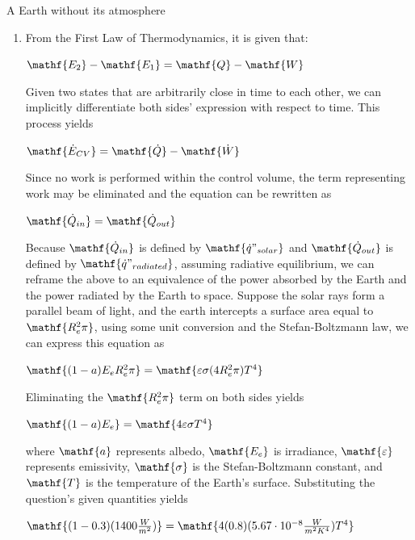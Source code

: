 \documentclass{homework}
\begin{document}
\question A Earth without its atmosphere
\begin{enumerate}[label=(\alph*)]
    \item
    From the First Law of Thermodynamics, it is given that:
    \begin{center}$\mathf{E_2} - \mathf{E_1} = \mathf{Q} - \mathf{W}$
    \end{center}
    Given two states that are arbitrarily close in time to each other, we can implicitly differentiate both sides' expression with respect to time. This process yields
    \begin{center}$\mathf{\dot E_{CV}} = \mathf{\dot Q} - \mathf{\dot W}$\end{center}
    Since no work is performed within the control volume, the term representing work may be eliminated and the equation can be rewritten as
    \begin{center}$\mathf{\dot Q_{in}} = \mathf{\dot Q_{out}}$
    \end{center}
    Because $\mathf{\dot Q_{in}}$ is defined by $\mathf{\dot q"_{solar}}$ and $\mathf{\dot Q_{out}}$ is defined by $\mathf{\dot q"_{radiated}}$, assuming radiative equilibrium, we can reframe the above to an equivalence of the power absorbed by the Earth and the power radiated by the Earth to space. Suppose the solar rays form a parallel beam of light, and the earth intercepts a surface area equal to $\mathf{R_e^2\pi}$, using some unit conversion and the Stefan-Boltzmann law, we can express this equation as
    \begin{center}
        $\mathf{(1 - a) E_e{R_e^2\pi}} =\mathf{\varepsilon\sigma(4{R_e^2\pi})T^4}$
    \end{center}
   \begin{center}
       Eliminating the $\mathf{R_e^2\pi}$ term on both sides yields
   \end{center} 
    \begin{center}
        $\mathf{(1 - a)E_e} = \mathf{4\varepsilon\sigma T^4}$
    \end{center}
    where $\mathf{a}$ represents albedo, $\mathf{E_e}$ is irradiance, $\mathf{\varepsilon}$ represents emissivity, $\mathf{\sigma}$ is the Stefan-Boltzmann constant, and $\mathf{T}$ is the temperature of the Earth's surface. Substituting the question's given quantities yields
    \begin{center}
        $\mathf{(1 - 0.3)(1400\frac{W}{m^2})} =\mathf{4(0.8)(5.67\cdot 10^{-8}\frac{W}{m^2K^4})T^4}$
    \end{center}
    \begin{center}

\end{center}
\end{enumerate}
\end{document}
